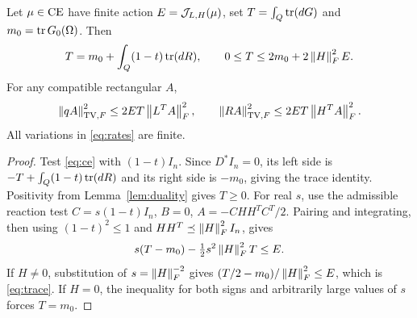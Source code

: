 \begin{lemma}\label{lem:rates}
Let $\mu\in\operatorname{CE}$ have finite action $E=\mathcal J_{L,H}(\mu)$, set
$T=\int_Q\operatorname{tr}(dG)$ and $m_0=\operatorname{tr} G_0(\Omega)$. Then
\begin{equation}\label{eq:trace}
 T=m_0+\int_Q(1-t)\operatorname{tr}(dR),\qquad
 0\le T\le2m_0+2\left\lVert H\right\rVert_F^2 E.
\end{equation}
For any compatible rectangular $A$,
\begin{equation}\label{eq:rates}
 \left\lVert qA\right\rVert_{\operatorname{TV},F}^2\le2ET\left\lVert L^TA\right\rVert_F^2,
 \qquad\left\lVert RA\right\rVert_{\operatorname{TV},F}^2\le2ET\left\lVert H^TA\right\rVert_F^2.
\end{equation}
All variations in \eqref{eq:rates} are finite.
\end{lemma}
\begin{proof}
Test \eqref{eq:ce} with $(1-t)I_n$. Since $D^*I_n=0$, its left side is
$-T+\int_Q(1-t)\operatorname{tr}(dR)$ and its right side is $-m_0$, giving the trace
identity. Positivity from Lemma~\ref{lem:duality} gives $T\ge0$.
For real $s$, use the admissible reaction test
$C=s(1-t)I_n$, $B=0$, $A=-CHH^TC^T/2$. Pairing and integrating, then using
$(1-t)^2\le1$ and $HH^T\preceq\left\lVert H\right\rVert_F^2I_n$, gives
\[
 s(T-m_0)-\tfrac12s^2\left\lVert H\right\rVert_F^2T\le E.
\]
If $H\ne0$, substitution of $s=\left\lVert H\right\rVert_F^{-2}$ gives
$(T/2-m_0)/\left\lVert H\right\rVert_F^2\le E$, which is \eqref{eq:trace}.
If $H=0$, the inequality for both signs and arbitrarily large values of
$s$ forces $T=m_0$.


\end{proof}
